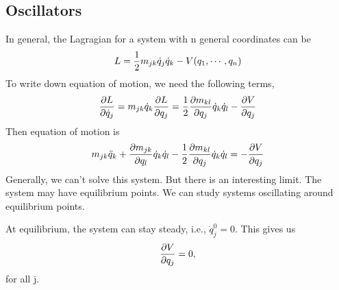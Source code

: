 \documentclass[letterpaper,10pt,english]{sphinxmanual}
\begin{document}
\subsection{Oscillators}
\label{ClassicalMechanics:oscillators}
In general, the Lagragian for a system with n general coordinates can be
\begin{gather}
\begin{split}L = \frac{1}{2} m _ {jk} \dot q_j \dot q_k - V(q_1, \cdots, q_n)\end{split}\notag
\end{gather}
To write down equation of motion, we need the following terms,
\begin{gather}
\begin{split}\frac{\partial L}{\partial \dot q_j} = m_{jk} \dot q_k
\frac{\partial L}{\partial q_j} = \frac{1}{2} \frac{\partial m_{kl}}{\partial q_j} \dot q_k \dot q_l - \frac{\partial V}{\partial q_j}\end{split}\notag
\end{gather}
Then equation of motion is
\begin{gather}
\begin{split}m_{jk} \ddot q_{k} + \frac{\partial m_{jk}}{\partial q_l} \dot q_k \dot q_l - \frac{1}{2} \frac{\partial m_{kl}}{\partial q_j} \dot q_k \dot q_l = - \frac{\partial V}{\partial q_j}\end{split}\notag
\end{gather}
Generally, we can't solve this system. But there is an interesting limit. The system may have equilibrium points. We can study systems oscillating around equilibrium points.

At equilibrium, the system can stay steady, i.e., \(\dot q_j^0 = 0\). This gives us
\begin{gather}
\begin{split}\frac{\partial V}{\partial q_j} = 0 ,\end{split}\notag
\end{gather}
for all j.
\end{document}
